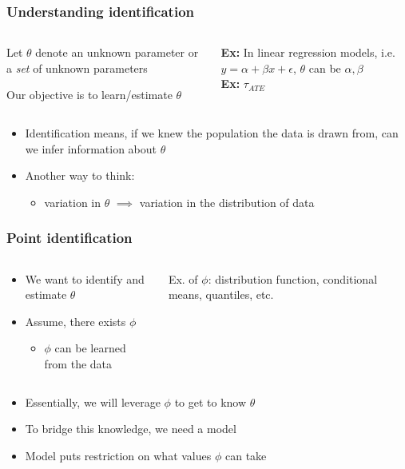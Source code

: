 \documentclass{beamer}
\newenvironment{bigitemize}{\itemize\addtolength{\itemsep}{10pt}}{\enditemize}
\begin{document}
\begin{frame}
	\frametitle{Understanding identification}
	\begin{columns}[T] %
		\begin{column}{0.7\linewidth}
			\begin{bigitemize}
				\item Let $\theta$ denote an unknown parameter or a \textit{set} of unknown parameters
				\item Our objective is to learn/estimate $\theta$
			\end{bigitemize}	
		\end{column}
		\pause
		\begin{column}{0.25\linewidth}
			\textbf{Ex:} In linear regression models, i.e. $y = \alpha + \beta x + \epsilon$, $\theta$ can be $\alpha, \beta$\\
			\pause
			\textbf{Ex:} $\tau_{ATE}$
		\end{column}
	\end{columns}

	\begin{itemize}
		\item Identification means, if we knew the population the data is drawn from, can we infer information about $\theta$
		\item Another way to think: 
			\begin{itemize}
				\item variation in $\theta$ $\implies$ variation in the distribution of data
			\end{itemize}
	\end{itemize}
\end{frame}

\begin{frame}
	\frametitle{Point identification}
	\begin{columns}[T]
		\begin{column}{0.6\linewidth}
			\begin{itemize}
				\item We want to identify and estimate $\theta$
				\item Assume, there exists $\phi$
				\begin{itemize}
					\item $\phi$ can be learned from the data
				\end{itemize}
			\end{itemize}	
		\end{column}
		\pause
		\begin{column}{0.3\linewidth}
			Ex. of $\phi$: distribution function, conditional means, quantiles, etc.
		\end{column}
	\end{columns}
	\vspace{1cm}
	\pause
	\begin{itemize}
		\item Essentially, we will leverage $\phi$ to get to know $\theta$
		\item To bridge this knowledge, we need a model
		\item Model puts restriction on what values $\phi$ can take
	\end{itemize}
\end{frame}
\end{document}

